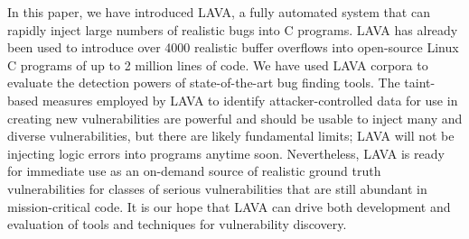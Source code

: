 In this paper, we have introduced LAVA, a fully automated system that can rapidly inject large numbers of realistic bugs into C programs.
LAVA has already been used to introduce over 4000 realistic buffer overflows into open-source Linux C programs of up to 2 million lines of code.  
We have used LAVA corpora to evaluate the detection powers of state-of-the-art bug finding tools.
The taint-based measures employed by LAVA to identify attacker-controlled data for use in creating new vulnerabilities are powerful and should be usable to inject many and diverse vulnerabilities, but there are likely fundamental limits; LAVA will not be injecting logic errors into programs anytime soon.
Nevertheless, LAVA is ready for immediate use as an on-demand source of realistic ground truth vulnerabilities for classes of serious vulnerabilities that are still abundant in mission-critical code.
It is our hope that LAVA can drive both development and evaluation of tools and techniques for vulnerability discovery.


